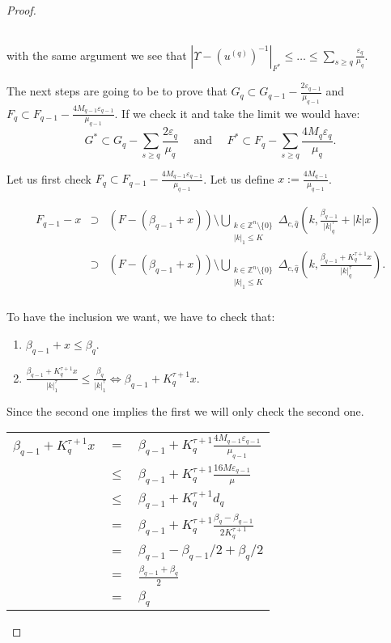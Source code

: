 \begin{proof}
\begin{enumerate}
\begin{longtable}{rcl}
\end{longtable}

with the same argument we see that $|\Upsilon - (u^{(q)})^{-1}|_{F^*} \leq \ldots \leq \sum_{s \geq q} \frac{\varepsilon_q}{\mu_q}$.

The next steps are going to be to prove that $G_q \subset G_{q-1} - \frac{2\varepsilon_{q-1}}{\mu_{q-1}}$ and $F_q \subset F_{q-1} - \frac{4 M_{q-1}\varepsilon_{q-1}}{\mu_{q-1}}$. If we check it and take the limit we would have:
$$G^* \subset G_q - \sum_{s\geq q} \frac{2\varepsilon_q}{\mu_q} \quad \text{ and } \quad F^* \subset F_q - \sum_{s\geq q} \frac{4 M_q \varepsilon_q}{\mu_q}.$$

Let us first check $F_q \subset F_{q-1} - \frac{4 M_{q-1} \varepsilon_{q-1}}{\mu_{q-1}}$. Let us define $x := \frac{4M_{q-1}}{\mu_{q-1}}$.

$$
\begin{array}{rcl}
 F_{q-1} -x& \supset & (F-(\beta_{q-1}+x))\setminus\bigcup_{\substack{k\in\mathbb{Z}^n\setminus\{0\} \\ |k|_1 \leq K}} \Delta_{c,\hat q}(k,\frac{\beta_{q-1}}{|k|_q^\tau} + |k|x) \\
 & \supset & (F-(\beta_{q-1}+x))\setminus\bigcup_{\substack{k\in\mathbb{Z}^n\setminus\{0\} \\ |k|_1 \leq K}} \Delta_{c,\hat q}(k,\frac{\beta_{q-1} + K_q^{\tau+1}x}{|k|_q^\tau}). \\
\end{array}
$$

To have the inclusion we want, we have to check that:

\begin{enumerate}
\item $\beta_{q-1}+x \leq \beta_q.$
\item $\frac{\beta_{q-1} + K_q^{\tau+1}x}{|k|_1^\tau} \leq \frac{\beta_q}{|k|_1^\tau} \Leftrightarrow \beta_{q-1} + K_q^{\tau+1}x.$
\end{enumerate}

Since the second one implies the first we will only check the second one.

\begin{longtable}{rcl}
$\beta_{q-1} + K_q^{\tau+1}x$ & $=$ & $\beta_{q-1} + K_q^{\tau+1}\frac{4M_{q-1}\varepsilon_{q-1}}{\mu_{q-1}}$\\
& $\leq$ & $\beta_{q-1} + K_q^{\tau+1}\frac{16M\varepsilon_{q-1}}{\mu}$\\
& $\leq$ & $\beta_{q-1} + K_q^{\tau+1}d_q$\\
& $=$ & $\beta_{q-1} + K_q^{\tau+1}\frac{\beta_q-\beta_{q-1}}{2K_q^{\tau+1}}$\\
& $=$ & $\beta_{q-1} - \beta_{q-1}/2 + \beta_{q}/2$\\
& $=$ & $\frac{\beta_{q-1} + \beta_{q}}{2}$\\
& $=$ & $\beta_{q}$\\
\end{longtable}


\end{enumerate}
\end{proof}
